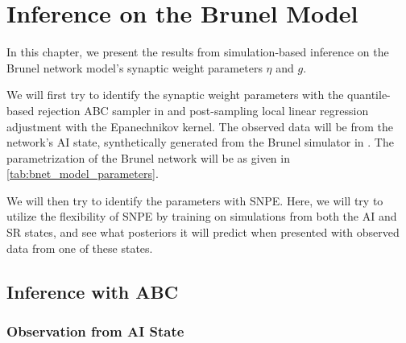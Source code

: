 \chapter{Inference on the Brunel Model}\label{chap:res_brunel}

In this chapter, we present the results from simulation-based inference on the Brunel network model's synaptic weight parameters $\eta$ and $g$. 

We will first try to identify the synaptic weight parameters with the quantile-based rejection ABC sampler in  and post-sampling local linear regression adjustment with the Epanechnikov kernel. The observed data will be from the network's AI state, synthetically generated from the Brunel simulator in . The parametrization of the Brunel network will be as given in \autoref{tab:bnet_model_parameters}.  

We will then try to identify the parameters with SNPE. Here, we will try to utilize the flexibility of SNPE by training on simulations from both the AI and SR states, and see what posteriors it will predict when presented with observed data from one of these states. 

\section{Inference with ABC}

\subsection{Observation from AI State}

